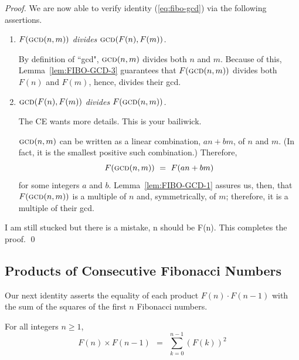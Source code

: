 \begin{proof}
\medskip

\noindent
We are now able to verify identity (\ref{eq:fibo-gcd}) via the following assertions.

\medskip

\begin{enumerate}
\item
{\em $F(\mbox{\sc gcd}(n,m))$ divides $\mbox{\sc gcd}(F(n), F(m))$.}

\smallskip

By definition of ``{\sc gcd}", $\mbox{\sc gcd}(n,m)$ divides both $n$ and $m$.  Because of this,
Lemma~\ref{lem:FIBO-GCD-3} guarantees that $F(\mbox{\sc gcd}(n,m))$ divides both $F(n)$ and $F(m)$, hence, divides their {\sc gcd}.

\medskip

\item
{\em $\mbox{\sc gcd}(F(n), F(m))$ divides $F(\mbox{\sc gcd}(n,m))$.}

\smallskip

{\Arny The CE wants more details.  This is your bailiwick.}

$\mbox{\sc gcd}(n,m)$ can be written as a linear combination, $a n + b m$, of $n$ and $m$.  (In fact, it is the smallest positive such combination.) Therefore, 
\[ F(\mbox{\sc gcd}(n,m)) \ = \ F(a n + b m) \]
for some integers $a$ and $b$.  Lemma~\ref{lem:FIBO-GCD-1} assures us, then, that
$F(\mbox{\sc gcd}(n,m))$ is a multiple of $n$ and, symmetrically, of $m$; therefore, it is a multiple of their {\sc gcd}. 
\end{enumerate}
{\Arny I am still stucked but there is a mistake, n should be F(n).}
This completes the proof.   \qed
\end{proof}

\subsection{Products of Consecutive Fibonacci Numbers}
\label{sec:product-Fn-Fn+1}

Our next identity asserts the equality of each product $F(n) \cdot F(n-1)$ with the sum of the squares of the first $n$ Fibonacci numbers.

\begin{prop} 
\label{thm:FiboSumConsecutive}
For all integers $n \geq 1$,
\begin{equation}
\label{eq:FiboSumConsecutive}
F(n) \times F(n-1) \ \ = \ \ \sum_{k=0}^{n-1} (F(k))^2
\end{equation}
\end{prop}

